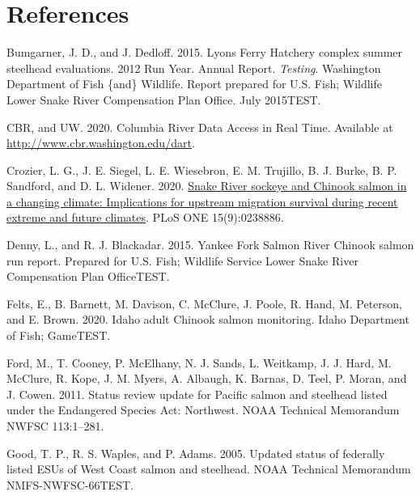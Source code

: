 \documentclass[
  letterpaper,
  oneside,
  open=any]{scrbook}
\newlength{\cslhangindent}
\newlength{\cslentryspacingunit} %
\newenvironment{CSLReferences}[2] %
 {%
  \setlength{\parindent}{0pt}
  \ifodd #1
  \let\oldpar\par
  \def\par{\hangindent=\cslhangindent\oldpar}
  \fi
  \setlength{\parskip}{#2\cslentryspacingunit}
 }%
 {}
\begin{document}
\hypertarget{references}{%
\chapter*{References}\label{references}}


\hypertarget{refs}{}
\begin{CSLReferences}{1}{0}
\leavevmode{}%
Bumgarner, J. D., and J. Dedloff. 2015. Lyons {Ferry} {Hatchery} complex
summer steelhead evaluations. 2012 {Run} {Year}. {Annual} {Report}.
\emph{Testing}. Washington Department of Fish \{and\} Wildlife. Report
prepared for U.S. Fish; Wildlife Lower Snake River Compensation Plan
Office. July 2015TEST.

\leavevmode{}%
CBR, and UW. 2020. Columbia {River} {Data} {Access} in {Real} {Time}.
Available at \url{http://www.cbr.washington.edu/dart}.

\leavevmode{}%
Crozier, L. G., J. E. Siegel, L. E. Wiesebron, E. M. Trujillo, B. J.
Burke, B. P. Sandford, and D. L. Widener. 2020.
\href{https://doi.org/10.1371/journal.pone.0238886.}{Snake {River}
sockeye and {Chinook} salmon in a changing climate: {Implications} for
upstream migration survival during recent extreme and future climates}.
PLoS ONE 15(9):0238886.

\leavevmode{}%
Denny, L., and R. J. Blackadar. 2015. Yankee {Fork} {Salmon} {River}
{Chinook} salmon run report. Prepared for U.S. Fish; Wildlife Service
Lower Snake River Compensation Plan OfficeTEST.

\leavevmode{}%
Felts, E., B. Barnett, M. Davison, C. McClure, J. Poole, R. Hand, M.
Peterson, and E. Brown. 2020. Idaho adult {Chinook} salmon monitoring.
Idaho Department of Fish; GameTEST.

\leavevmode{}%
Ford, M., T. Cooney, P. McElhany, N. J. Sands, L. Weitkamp, J. J. Hard,
M. McClure, R. Kope, J. M. Myers, A. Albaugh, K. Barnas, D. Teel, P.
Moran, and J. Cowen. 2011. Status review update for {Pacific} salmon and
steelhead listed under the {Endangered} {Species} {Act}: {Northwest}.
NOAA Technical Memorandum NWFSC 113:1--281.

\leavevmode{}%
Good, T. P., R. S. Waples, and P. Adams. 2005. Updated status of
federally listed {ESUs} of {West} {Coast} salmon and steelhead. NOAA
Technical Memorandum NMFS-NWFSC-66TEST.


\end{CSLReferences}
\end{document}
